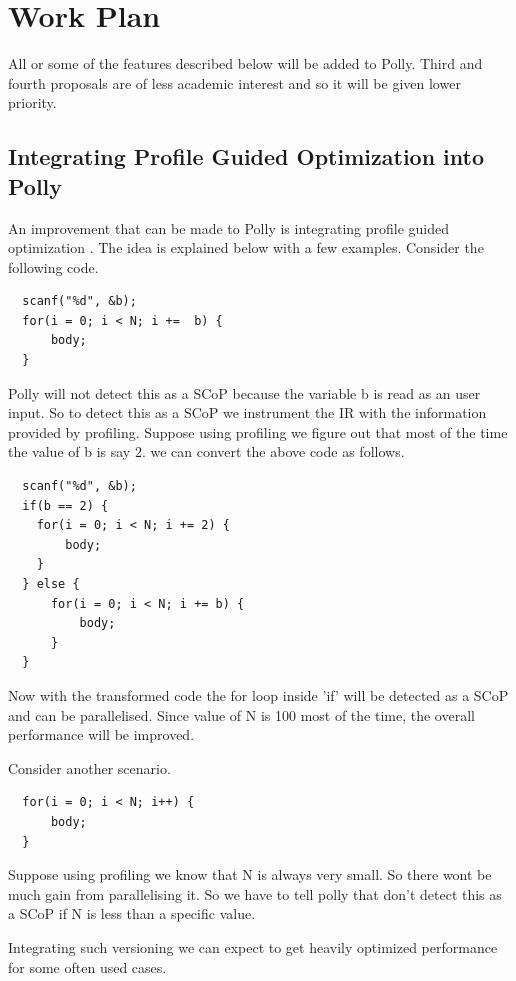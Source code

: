 \documentclass[a4paper,10pt]{article}
\begin{document}
\section{Work Plan}
All or some of the features described below will be added to Polly. Third and fourth
proposals are of less academic interest and so it will be given lower priority.
\subsection{Integrating Profile Guided Optimization into Polly}
An improvement that can be made to Polly is integrating profile guided optimization
\cite{pgo}. The idea is explained below with a few examples. Consider the following code.
{\footnotesize
\begin{lstlisting}
  scanf("%d", &b);
  for(i = 0; i < N; i +=  b) {
      body;
  }
\end{lstlisting}
}
Polly will not detect this as a SCoP because the variable b is read as an user
input. So to detect this as a SCoP we instrument the IR with the information
provided by profiling. Suppose using profiling we figure out that most of the 
time the value of b is say 2. we can convert the above code as follows.
{\footnotesize
\begin{lstlisting}
  scanf("%d", &b);
  if(b == 2) {
    for(i = 0; i < N; i += 2) {
        body;
    }
  } else {
      for(i = 0; i < N; i += b) {
          body;
      }
  }
\end{lstlisting}
}
Now with the transformed code the for loop inside 'if' will be detected as a 
SCoP and can be parallelised. Since value of N is 100 most of the time, the 
overall performance will be improved.

Consider another scenario.
{\footnotesize
\begin{lstlisting}
  for(i = 0; i < N; i++) {
      body;
  }
\end{lstlisting}
}
Suppose using profiling we know that N is always very small. So there wont be
much gain from parallelising it. So we have to tell polly that don't detect
this as a SCoP if N is less than a specific value.

Integrating such versioning we can expect to get heavily optimized performance 
for some often used cases.
\end{document}
